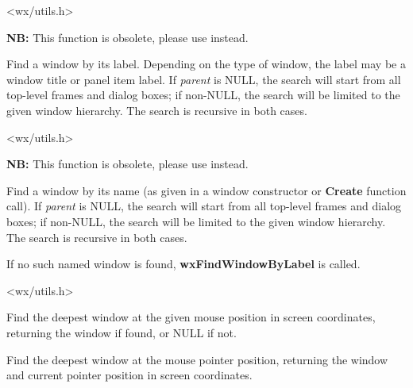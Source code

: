 
<wx/utils.h>


\label{wxfindwindowbylabel}


{\bf NB:} This function is obsolete, please use
 instead.

Find a window by its label. Depending on the type of window, the label may be a window title
or panel item label. If {\it parent} is NULL, the search will start from all top-level
frames and dialog boxes; if non-NULL, the search will be limited to the given window hierarchy.
The search is recursive in both cases.


<wx/utils.h>


\label{wxfindwindowbyname}


{\bf NB:} This function is obsolete, please use
 instead.

Find a window by its name (as given in a window constructor or {\bf Create} function call).
If {\it parent} is NULL, the search will start from all top-level
frames and dialog boxes; if non-NULL, the search will be limited to the given window hierarchy.
The search is recursive in both cases.

If no such named window is found, {\bf wxFindWindowByLabel} is called.


<wx/utils.h>


\label{wxfindwindowatpoint}


Find the deepest window at the given mouse position in screen coordinates,
returning the window if found, or NULL if not.


\label{wxfindwindowatpointer}


Find the deepest window at the mouse pointer position, returning the window
and current pointer position in screen coordinates.


